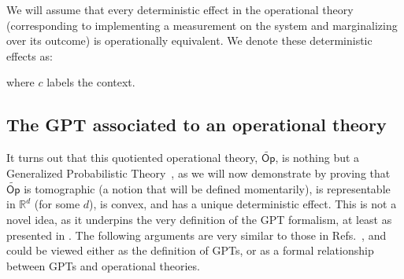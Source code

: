 \documentclass[onecolum,aps,groupedaddress,nofootinbib]{revtex4-2}
\newcommand\Op{\mathsf{Op}}
\begin{document}
We will assume that every deterministic effect  in the operational theory (corresponding to implementing a measurement on the system and marginalizing over its outcome) is operationally equivalent. We denote these deterministic effects as:
\beq
{}
\eeq
where $c$ labels the context. 

\subsection{The GPT associated to an operational theory}

It turns out that this quotiented operational theory, $\widetilde{\Op}$, is nothing but a Generalized Probabilistic Theory~\cite{hardy2001quantum,barrett2007}, as we will now demonstrate by proving that $\widetilde{\Op}$ is tomographic (a notion that will be defined momentarily),
 is representable in $\mathds{R}^d$ (for some $d$), is convex, and has a unique deterministic effect. This is not a novel idea, as it underpins the very definition of the GPT formalism, at least as presented in \cite{hardy2011reformulating,chiribella2010probabilistic}. The following arguments are very similar to those in Refs.~\cite{chiribella2010probabilistic,chiribella2014dilation,chiribella2016quantum},
and could be viewed either as the definition of GPTs, or as a formal relationship between GPTs and operational theories.
\end{document}
